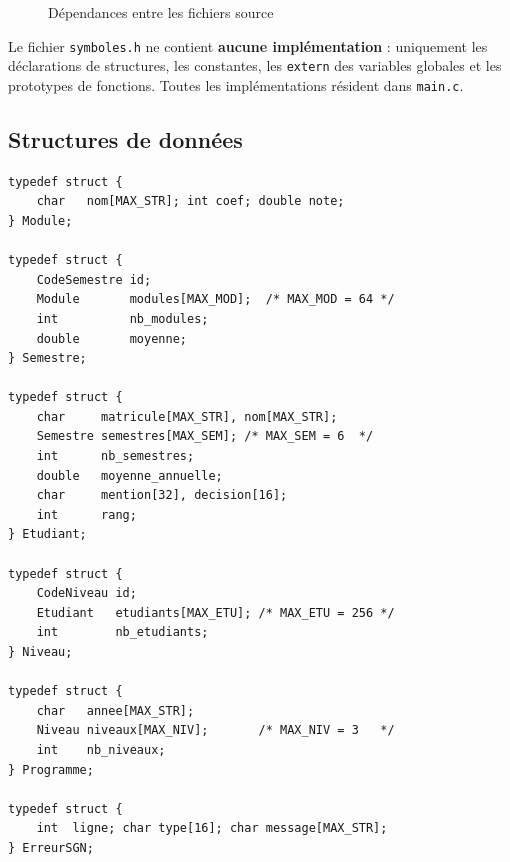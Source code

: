 \documentclass[10pt,a4paper]{article}
\begin{document}
\begin{figure}[h]
\centering
{}
\caption{Dépendances entre les fichiers source}
\end{figure}

Le fichier \texttt{symboles.h} ne contient \textbf{aucune implémentation} : uniquement
les déclarations de structures, les constantes, les \texttt{extern} des variables globales
et les prototypes de fonctions. Toutes les implémentations résident dans \texttt{main.c}.

\subsection{Structures de données}

\begin{lstlisting}[style=styleC, caption={Hiérarchie des structures dans \texttt{symboles.h}}]
typedef struct {
    char   nom[MAX_STR]; int coef; double note;
} Module;

typedef struct {
    CodeSemestre id;
    Module       modules[MAX_MOD];  /* MAX_MOD = 64 */
    int          nb_modules;
    double       moyenne;
} Semestre;

typedef struct {
    char     matricule[MAX_STR], nom[MAX_STR];
    Semestre semestres[MAX_SEM]; /* MAX_SEM = 6  */
    int      nb_semestres;
    double   moyenne_annuelle;
    char     mention[32], decision[16];
    int      rang;
} Etudiant;

typedef struct {
    CodeNiveau id;
    Etudiant   etudiants[MAX_ETU]; /* MAX_ETU = 256 */
    int        nb_etudiants;
} Niveau;

typedef struct {
    char   annee[MAX_STR];
    Niveau niveaux[MAX_NIV];       /* MAX_NIV = 3   */
    int    nb_niveaux;
} Programme;

typedef struct {
    int  ligne; char type[16]; char message[MAX_STR];
} ErreurSGN;
\end{lstlisting}
\end{document}
